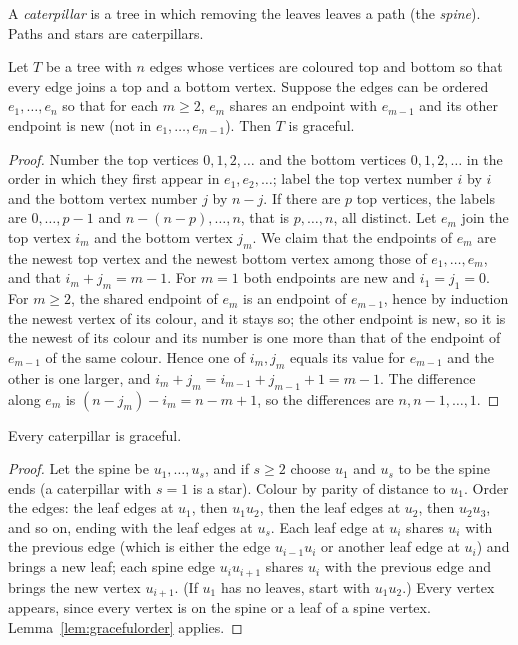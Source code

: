 A \emph{caterpillar} is a tree in which removing the leaves leaves a path (the \emph{spine}). Paths and stars are caterpillars.

\begin{lemma}\label{lem:gracefulorder}
Let $T$ be a tree with $n$ edges whose vertices are coloured top and bottom so that every edge joins a top and a bottom vertex. Suppose the edges can be ordered $e_1,\dots,e_n$ so that for each $m\ge2$, $e_m$ shares an endpoint with $e_{m-1}$ and its other endpoint is new (not in $e_1,\dots,e_{m-1}$). Then $T$ is graceful.
\end{lemma}

\begin{proof}
Number the top vertices $0,1,2,\dots$ and the bottom vertices $0,1,2,\dots$ in the order in which they first appear in $e_1,e_2,\dots$; label the top vertex number $i$ by $i$ and the bottom vertex number $j$ by $n-j$. If there are $p$ top vertices, the labels are $0,\dots,p-1$ and $n-(n-p),\dots,n$, that is $p,\dots,n$, all distinct. Let $e_m$ join the top vertex $i_m$ and the bottom vertex $j_m$. We claim that the endpoints of $e_m$ are the newest top vertex and the newest bottom vertex among those of $e_1,\dots,e_m$, and that $i_m+j_m=m-1$. For $m=1$ both endpoints are new and $i_1=j_1=0$. For $m\ge2$, the shared endpoint of $e_m$ is an endpoint of $e_{m-1}$, hence by induction the newest vertex of its colour, and it stays so; the other endpoint is new, so it is the newest of its colour and its number is one more than that of the endpoint of $e_{m-1}$ of the same colour. Hence one of $i_m,j_m$ equals its value for $e_{m-1}$ and the other is one larger, and $i_m+j_m=i_{m-1}+j_{m-1}+1=m-1$. The difference along $e_m$ is $(n-j_m)-i_m=n-m+1$, so the differences are $n,n-1,\dots,1$.
\end{proof}

\begin{proposition}[Rosa, 1967]\label{prop:caterpillar}
Every caterpillar is graceful.
\end{proposition}

\begin{proof}
Let the spine be $u_1,\dots,u_s$, and if $s\ge2$ choose $u_1$ and $u_s$ to be the spine ends (a caterpillar with $s=1$ is a star). Colour by parity of distance to $u_1$. Order the edges: the leaf edges at $u_1$, then $u_1u_2$, then the leaf edges at $u_2$, then $u_2u_3$, and so on, ending with the leaf edges at $u_s$. Each leaf edge at $u_i$ shares $u_i$ with the previous edge (which is either the edge $u_{i-1}u_i$ or another leaf edge at $u_i$) and brings a new leaf; each spine edge $u_iu_{i+1}$ shares $u_i$ with the previous edge and brings the new vertex $u_{i+1}$. (If $u_1$ has no leaves, start with $u_1u_2$.) Every vertex appears, since every vertex is on the spine or a leaf of a spine vertex. Lemma~\ref{lem:gracefulorder} applies.
\end{proof}

